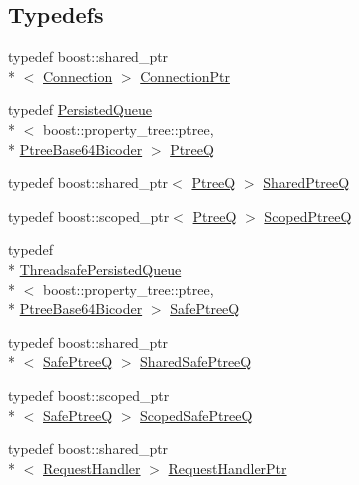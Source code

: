 \subsection*{Typedefs}
\begin{DoxyCompactItemize}
\item 
typedef boost\-::shared\-\_\-ptr\\*
$<$ \hyperlink{classkisscpp_1_1_connection}{Connection} $>$ \hyperlink{namespacekisscpp_a4632e92aebdc8fa1c220da260469cbb2}{Connection\-Ptr}
\item 
typedef \hyperlink{classkisscpp_1_1_persisted_queue}{Persisted\-Queue}\\*
$<$ boost\-::property\-\_\-tree\-::ptree, \\*
\hyperlink{classkisscpp_1_1_ptree_base64_bicoder}{Ptree\-Base64\-Bicoder} $>$ \hyperlink{namespacekisscpp_af1d6724570f46ac378171bd45ddf6903}{Ptree\-Q}
\item 
typedef boost\-::shared\-\_\-ptr$<$ \hyperlink{namespacekisscpp_af1d6724570f46ac378171bd45ddf6903}{Ptree\-Q} $>$ \hyperlink{namespacekisscpp_aecf9f29bb4c41e0d4dbc74731a3020cd}{Shared\-Ptree\-Q}
\item 
typedef boost\-::scoped\-\_\-ptr$<$ \hyperlink{namespacekisscpp_af1d6724570f46ac378171bd45ddf6903}{Ptree\-Q} $>$ \hyperlink{namespacekisscpp_a64a7093fe1bdc3f323b469e800eebc7f}{Scoped\-Ptree\-Q}
\item 
typedef \\*
\hyperlink{classkisscpp_1_1_threadsafe_persisted_queue}{Threadsafe\-Persisted\-Queue}\\*
$<$ boost\-::property\-\_\-tree\-::ptree, \\*
\hyperlink{classkisscpp_1_1_ptree_base64_bicoder}{Ptree\-Base64\-Bicoder} $>$ \hyperlink{namespacekisscpp_ac48ab954f4898861f383b80e857e17cc}{Safe\-Ptree\-Q}
\item 
typedef boost\-::shared\-\_\-ptr\\*
$<$ \hyperlink{namespacekisscpp_ac48ab954f4898861f383b80e857e17cc}{Safe\-Ptree\-Q} $>$ \hyperlink{namespacekisscpp_ae95e969e7f5dfd1f36842ac9aa25c7ea}{Shared\-Safe\-Ptree\-Q}
\item 
typedef boost\-::scoped\-\_\-ptr\\*
$<$ \hyperlink{namespacekisscpp_ac48ab954f4898861f383b80e857e17cc}{Safe\-Ptree\-Q} $>$ \hyperlink{namespacekisscpp_a20653e6629a85affc6a1b8529e0a8da0}{Scoped\-Safe\-Ptree\-Q}
\item 
typedef boost\-::shared\-\_\-ptr\\*
$<$ \hyperlink{classkisscpp_1_1_request_handler}{Request\-Handler} $>$ \hyperlink{namespacekisscpp_a21e40edcd4f1a3c7c1cc0015b576c8e5}{Request\-Handler\-Ptr}
\end{DoxyCompactItemize}

